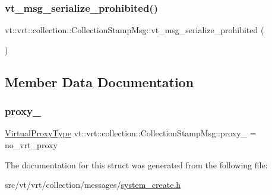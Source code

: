 \subsubsection{\texorpdfstring{vt\+\_\+msg\+\_\+serialize\+\_\+prohibited()}{vt\_msg\_serialize\_prohibited()}}
{\footnotesize\ttfamily vt\+::vrt\+::collection\+::\+Collection\+Stamp\+Msg\+::vt\+\_\+msg\+\_\+serialize\+\_\+prohibited (\begin{DoxyParamCaption}{ }\end{DoxyParamCaption})}



\subsection{Member Data Documentation}
\mbox{\label{structvt_1_1vrt_1_1collection_1_1_collection_stamp_msg_a14b201da61295140c6947db17718105a}} 
\subsubsection{\texorpdfstring{proxy\+\_\+}{proxy\_}}
{\footnotesize\ttfamily \hyperlink{namespacevt_a1b417dd5d684f045bb58a0ede70045ac}{Virtual\+Proxy\+Type} vt\+::vrt\+::collection\+::\+Collection\+Stamp\+Msg\+::proxy\+\_\+ = no\+\_\+vrt\+\_\+proxy}



The documentation for this struct was generated from the following file\+:\begin{DoxyCompactItemize}
\item 
src/vt/vrt/collection/messages/\hyperlink{system__create_8h}{system\+\_\+create.\+h}\end{DoxyCompactItemize}
